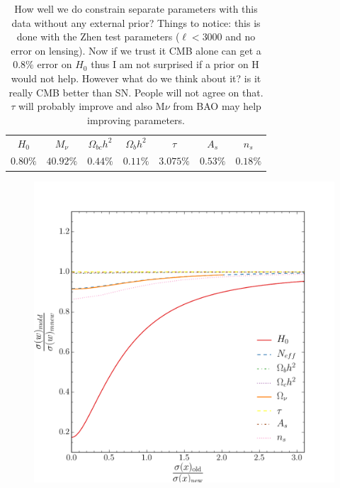 \documentclass[aps,prd,preprint,groupedaddress]{revtex4-1}
\begin{document}
\begin{table}[htdp]

\begin{center}
\begin{tabular}{|c|c|c|c|c|c|c|}
\hline
$H_{0}$ &$ M_{\nu}$ &$\Omega_{bc}h^{2}$&$\Omega_{b}h^{2}$&$\tau$&$A_{s}$&$n_{s}$ \\
$0.80 \%$&$40.92\%$&$0.44\%$&$0.11\%$&$3.075\%$&$0.53\%$&$0.18\%$\\

\hline
\end{tabular}
\caption{How well we do constrain separate parameters with this data without any external prior? Things to notice: this is done with the Zhen test parameters ($\ell<3000$ and no error on lensing). Now if we trust it CMB alone can get a $0.8\%$ error on $H_{0}$ thus I am not surprised if a prior on H would not help. However what do we think about it? is it really CMB better than SN. People will not agree on that. $\tau$ will probably improve and also M$\nu$ from BAO may help improving parameters.}
\end{center}
\label{default}
\end{table}%


\begin{figure}[htbp]
\begin{center}
\includegraphics[scale=0.6]{prior_w.pdf}
\caption{}
\label{fig:prior_w}
\end{center}
\end{figure}
\end{document}
